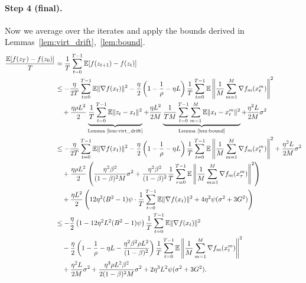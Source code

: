 \paragraph{Step 4 (final).} Now we average over the iterates and apply the bounds derived in Lemmas~\ref{lem:virt_drift},~\ref{lem:bound}.
\begin{align*}
\frac{\mathbb{E}[f(z_T) - f(z_0)]}{T}
&= \frac{1}{T}\sum_{t=0}^{T-1}\mathbb{E}[f(z_{t+1}) - f(z_t)] \\
&\leq -\frac{\eta}{2T}\sum_{t=0}^{T-1}\mathbb{E}\|\nabla f(x_t)\|^2
  - \frac{\eta}{2}\left(1 - \frac{1}{\rho} - \eta L\right)
    \frac{1}{T}\sum_{t=0}^{T-1}\mathbb{E}\left\|\frac{1}{M}\sum_{m=1}^{M}\nabla f_m(x_t^m)\right\|^2 \\
&\quad + \frac{\eta\rho L^2}{2}\underbrace{\frac{1}{T}\sum_{t=0}^{T-1}\mathbb{E}\|z_t - x_t\|^2}_{\text{Lemma~\ref{lem:virt_drift}}}
  + \frac{\eta L^2}{2M}\underbrace{\frac{1}{TM}\sum_{t=0}^{T-1}\sum_{m=1}^{M}\mathbb{E}\|x_t - x_t^m\|^2}_{\text{Lemma~\ref{lem:bound}}}
  + \frac{\eta^2 L}{2M}\sigma^2 \\
&\leq -\frac{\eta}{2T}\sum_{t=0}^{T-1}\mathbb{E}\|\nabla f(x_t)\|^2
  - \frac{\eta}{2}\left(1 - \frac{1}{\rho} - \eta L\right)
    \frac{1}{T}\sum_{t=0}^{T-1}\mathbb{E}\left\|\frac{1}{M}\sum_{m=1}^{M}\nabla f_m(x_t^m)\right\|^2
  + \frac{\eta^2 L}{2M}\sigma^2 \\
&\quad + \frac{\eta\rho L^2}{2}\left(
    \frac{\eta^2\beta^2}{(1-\beta)^2 M}\sigma^2
    + \frac{\eta^2\beta^2}{(1-\beta)^2}\frac{1}{T}\sum_{\tau=0}^{T-1}\mathbb{E}\left\|\frac{1}{M}\sum_{m=1}^{M}\nabla f_m(x_\tau^m)\right\|^2
  \right) \\
&\quad + \frac{\eta L^2}{2}\left(
    12\eta^2(B^2-1)\psi \cdot \frac{1}{T}\sum_{t=0}^{T-1}\mathbb{E}\|\nabla f(x_t)\|^2
    + 4\eta^2\psi(\sigma^2 + 3G^2)
  \right) \\
&\leq -\frac{\eta}{2}\left(1 - 12\eta^2 L^2(B^2-1)\psi\right)
    \frac{1}{T}\sum_{t=0}^{T-1}\mathbb{E}\|\nabla f(x_t)\|^2 \\
&\quad - \frac{\eta}{2}\left(1 - \frac{1}{\rho} - \eta L - \frac{\eta^2\beta^2\rho L^2}{(1-\beta)^2}\right)
    \frac{1}{T}\sum_{t=0}^{T-1}\mathbb{E}\left\|\frac{1}{M}\sum_{m=1}^{M}\nabla f_m(x_t^m)\right\|^2 \\
&\quad + \frac{\eta^2 L}{2M}\sigma^2
  + \frac{\eta^3\rho L^2\beta^2}{2(1-\beta)^2 M}\sigma^2
  + 2\eta^3 L^2\psi(\sigma^2 + 3G^2).
\end{align*}

